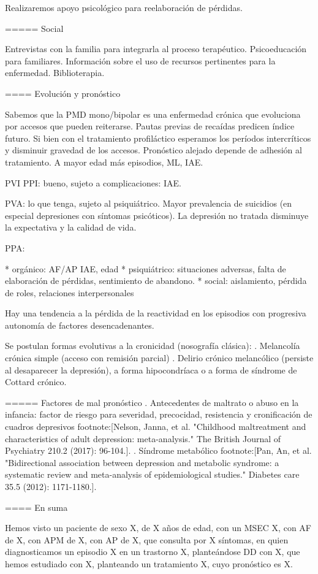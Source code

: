 Realizaremos apoyo psicológico para reelaboración de pérdidas.

===== Social

Entrevistas con la familia para integrarla al proceso terapéutico. Psicoeducación para familiares. Información sobre el uso de recursos pertinentes para la enfermedad. Biblioterapia.

==== Evolución y pronóstico

Sabemos que la PMD mono/bipolar es una enfermedad crónica que evoluciona por accesos que pueden reiterarse. Pautas previas de recaídas predicen índice futuro. Si bien con el tratamiento profiláctico esperamos los períodos intercríticos y disminuir gravedad de los accesos. Pronóstico alejado depende de adhesión al tratamiento. A mayor edad más episodios, ML, IAE.

PVI PPI: bueno, sujeto a complicaciones: IAE.

PVA: lo que tenga, sujeto al psiquiátrico. Mayor prevalencia de suicidios (en especial depresiones con síntomas psicóticos). La depresión no tratada disminuye la expectativa y la calidad de vida.

PPA:

* orgánico: AF/AP IAE, edad
* psiquiátrico: situaciones adversas, falta de elaboración de pérdidas, sentimiento de abandono.
* social: aislamiento, pérdida de roles, relaciones interpersonales

Hay una tendencia a la pérdida de la reactividad en los episodios con progresiva autonomía de factores desencadenantes.

Se postulan formas evolutivas a la cronicidad (nosografía clásica):
. Melancolía crónica simple (acceso con remisión parcial)
. Delirio crónico melancólico (persiste al desaparecer la depresión), a forma hipocondríaca o a forma de síndrome de Cottard crónico.

===== Factores de mal pronóstico
. Antecedentes de maltrato o abuso en la infancia: factor de riesgo para severidad, precocidad, resistencia y cronificación de cuadros depresivos footnote:[Nelson, Janna, et al. "Childhood maltreatment and characteristics of adult depression: meta-analysis." The British Journal of Psychiatry 210.2 (2017): 96-104.].
. Síndrome metabólico footnote:[Pan, An, et al. "Bidirectional association between depression and metabolic syndrome: a systematic review and meta-analysis of epidemiological studies." Diabetes care 35.5 (2012): 1171-1180.].

==== En suma

Hemos visto un paciente de sexo X, de X años de edad, con un MSEC X, con AF de X, con APM de X, con AP de X, que consulta por X síntomas, en quien diagnosticamos un episodio X en un trastorno X, planteándose DD con X, que hemos estudiado con X, planteando un tratamiento X, cuyo pronóstico es X.
